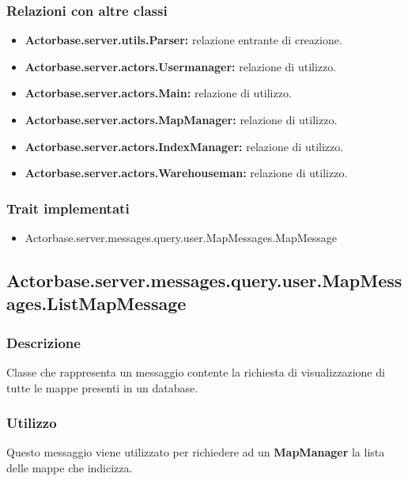 \documentclass[a4paper]{article}
\begin{document}
			\subsubsection{Relazioni con altre classi}
				\begin{itemize}
					\item \textbf{Actorbase.server.utils.Parser:} relazione entrante di creazione.
					\item \textbf{Actorbase.server.actors.Usermanager:} relazione di utilizzo.
					\item \textbf{Actorbase.server.actors.Main:} relazione di utilizzo.
					\item \textbf{Actorbase.server.actors.MapManager:} relazione di utilizzo.
					\item \textbf{Actorbase.server.actors.IndexManager:} relazione di utilizzo.
					\item \textbf{Actorbase.server.actors.Warehouseman:} relazione di utilizzo.
				\end{itemize}
			\subsubsection{Trait implementati}
				\begin{itemize}
					\item Actorbase.server.messages.query.user.MapMessages.MapMessage
				\end{itemize}
				
		\subsection{Actorbase.server.messages.query.user.MapMessages.ListMapMessage}
			\subsubsection{Descrizione}
				Classe che rappresenta un messaggio contente la richiesta di visualizzazione di tutte le mappe presenti in un database.
				
			\subsubsection{Utilizzo}
				Questo messaggio viene utilizzato per richiedere ad un \textbf{MapManager} la lista delle mappe che indicizza.
				
\end{document}

